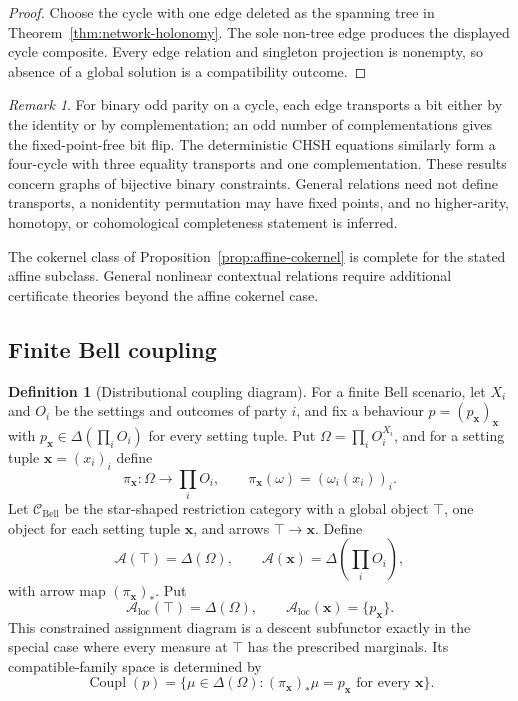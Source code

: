 \documentclass[11pt]{article}
\theoremstyle{plain}
\theoremstyle{definition}
\newtheorem{definition}[theorem]{Definition}
\theoremstyle{remark}
\newtheorem{remark}[theorem]{Remark}
\newcommand{\LocalAdm}{\mathcal{A}_{\mathrm{loc}}}
\begin{document}
\begin{proof}
Choose the cycle with one edge deleted as the spanning tree in
Theorem~\ref{thm:network-holonomy}. The sole non-tree edge produces the displayed
cycle composite. Every edge relation and singleton projection is nonempty, so
absence of a global solution is a compatibility outcome.
\end{proof}

\begin{remark}
For binary odd parity on a cycle, each edge transports a bit either by the
identity or by complementation; an odd number of complementations gives the
fixed-point-free bit flip. The deterministic CHSH equations similarly form a
four-cycle with three equality transports and one complementation. These results
concern graphs of bijective binary constraints. General relations need not
define transports, a nonidentity permutation may have fixed points, and no
higher-arity, homotopy, or cohomological completeness statement is inferred.
\end{remark}

The cokernel class of Proposition~\ref{prop:affine-cokernel} is complete for the
stated affine subclass. General nonlinear contextual relations require
additional certificate theories beyond the affine cokernel case.

\subsection{Finite Bell coupling}

\begin{definition}[Distributional coupling diagram]\label{def:bellpack}
For a finite Bell scenario, let $X_i$ and $O_i$ be the settings and outcomes of
party $i$, and fix a behaviour $p=(p_{\mathbf x})_{\mathbf x}$ with
$p_{\mathbf x}\in\Delta(\prod_iO_i)$ for every setting tuple. Put
$\Omega=\prod_iO_i^{X_i}$, and for a setting tuple
$\mathbf x=(x_i)_i$ define
\[
\pi_{\mathbf x}:\Omega\to\prod_iO_i,
\qquad
\pi_{\mathbf x}(\omega)=(\omega_i(x_i))_i.
\]
Let $\mathcal C_{\mathrm{Bell}}$ be the star-shaped restriction category with a
global object $\top$, one object for each setting tuple $\mathbf x$, and arrows
$\top\to\mathbf x$. Define
\[
\mathcal A(\top)=\Delta(\Omega),
\qquad
\mathcal A(\mathbf x)=\Delta\!\left(\prod_iO_i\right),
\]
with arrow map $(\pi_{\mathbf x})_*$. Put
\[
\LocalAdm(\top)=\Delta(\Omega),
\qquad
\LocalAdm(\mathbf x)=\{p_{\mathbf x}\}.
\]
This constrained assignment diagram is a descent subfunctor exactly in the
special case where every measure at $\top$ has the prescribed marginals. Its
compatible-family space is determined by
\[
\operatorname{Coupl}(p)=
\{\mu\in\Delta(\Omega):
(\pi_{\mathbf x})_*\mu=p_{\mathbf x}
\text{ for every }\mathbf x\}.
\]
\end{definition}
\end{document}
